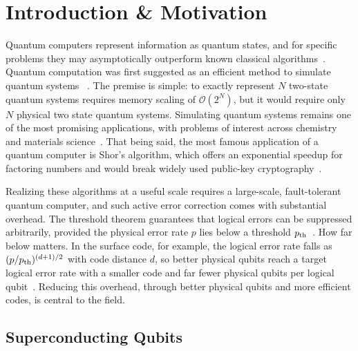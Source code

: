 
\chapter{Introduction \& Motivation} \label{chp:intro}

Quantum computers represent information as quantum states, and for specific problems they may asymptotically outperform known classical algorithms~\cite{NielsenChuang2010}.
Quantum computation was first suggested as an efficient method to simulate quantum systems ~\cite{feynman1982,lloyd1996}.
The premise is simple: to exactly represent $N$ two-state quantum systems requires memory scaling of $\mathcal{O}(2^N)$, but it would require only $N$ physical two state quantum systems.
Simulating quantum systems remains one of the most promising applications, with problems of interest across chemistry and materials science~\cite{bauer2020}.
That being said, the most famous application of a quantum computer is Shor's algorithm, which offers an exponential speedup for factoring numbers and would break widely used public-key cryptography~\cite{shorAlgorithmsQuantumComputation1994}.

Realizing these algorithms at a useful scale requires a large-scale, fault-tolerant quantum computer, and such active error correction comes with substantial overhead.
The threshold theorem guarantees that logical errors can be suppressed arbitrarily, provided the physical error rate $p$ lies below a threshold $p_{\rm th}$~\cite{aharonov2008,knill1998}.
How far below matters.
In the surface code, for example, the logical error rate falls as $(p/p_{\rm th})^{(d+1)/2}$ with code distance $d$, so better physical qubits reach a target logical error rate with a smaller code and far fewer physical qubits per logical qubit~\cite{fowler2012}.
Reducing this overhead, through better physical qubits and more efficient codes, is central to the field.

\section{Superconducting Qubits}



